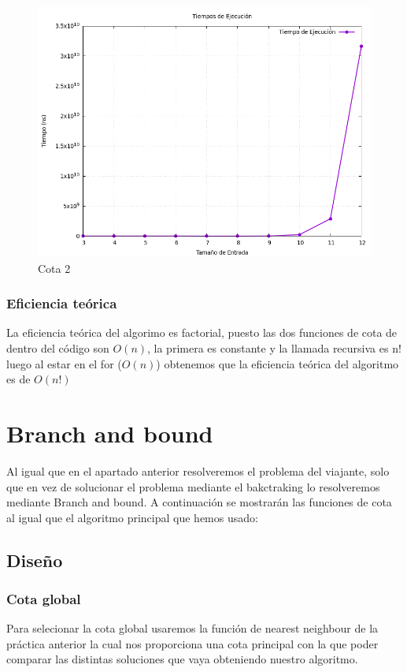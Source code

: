 \documentclass[11pt,openany]{book}
\begin{document}
\begin{figure}[H]
\begin{minipage}{.48\textwidth}
          \label{fig:Cota 3}
    \end{minipage}
\begin{minipage}{.48\textwidth}
      \centering
      \includegraphics[width=1\linewidth]{assets/Img/grafico_tiempos.png}
      \caption{Cota 2}
      \label{fig:Cota 3}
\end{minipage}
\end{figure}
\newpage
\subsection{Eficiencia teórica}
La eficiencia teórica del algorimo es factorial, puesto las dos funciones de cota de dentro del código son $O(n)$, la primera es constante y la llamada recursiva es n! luego al estar en el for ($O(n)$)
obtenemos que la eficiencia teórica del algoritmo es de $O(n!)$

\chapter{Branch and bound}
Al igual que en el apartado anterior resolveremos el problema del viajante, solo que en vez de solucionar el problema mediante el bakctraking 
lo resolveremos mediante Branch and bound. A continuación se mostrarán las funciones de cota al igual que el algoritmo principal que hemos usado:

\section{Diseño}
\subsection{Cota global}
Para selecionar la cota global usaremos la función de nearest neighbour de la práctica anterior la cual 
nos proporciona una cota principal con la que poder comparar las distintas soluciones que vaya obteniendo nuestro algoritmo.
\end{document}
